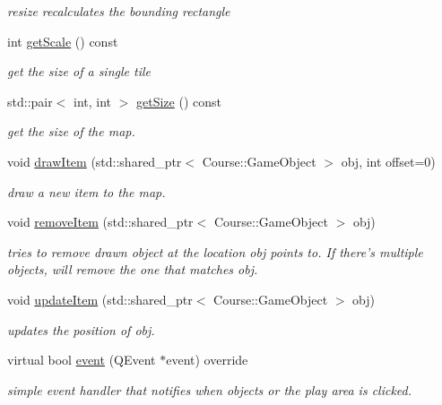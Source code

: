 \begin{DoxyCompactItemize}
\begin{DoxyCompactList}\small\item\em resize recalculates the bounding rectangle \end{DoxyCompactList}\item 
int \hyperlink{classGameScene_ab9902862cd5f550d9de3ff10cde80505}{get\-Scale} () const 
\begin{DoxyCompactList}\small\item\em get the size of a single tile \end{DoxyCompactList}\item 
std\-::pair$<$ int, int $>$ \hyperlink{classGameScene_a8c5c9cd5997ca6b17b2924f5cc09902c}{get\-Size} () const 
\begin{DoxyCompactList}\small\item\em get the size of the map. \end{DoxyCompactList}\item 
void \hyperlink{classGameScene_aaab2fceed119bca93ecf732e1f9aaa40}{draw\-Item} (std\-::shared\-\_\-ptr$<$ Course\-::\-Game\-Object $>$ obj, int offset=0)
\begin{DoxyCompactList}\small\item\em draw a new item to the map. \end{DoxyCompactList}\item 
void \hyperlink{classGameScene_a1cab3171dd8296baa28b091c5e8e22ab}{remove\-Item} (std\-::shared\-\_\-ptr$<$ Course\-::\-Game\-Object $>$ obj)
\begin{DoxyCompactList}\small\item\em tries to remove drawn object at the location obj points to. If there's multiple objects, will remove the one that matches obj. \end{DoxyCompactList}\item 
void \hyperlink{classGameScene_a8afcbd20cf3d7fa80dbf06883da17c2b}{update\-Item} (std\-::shared\-\_\-ptr$<$ Course\-::\-Game\-Object $>$ obj)
\begin{DoxyCompactList}\small\item\em updates the position of obj. \end{DoxyCompactList}\item 
virtual bool \hyperlink{classGameScene_a87d0fd08b1540319e8770e187379d4ba}{event} (Q\-Event $\ast$event) override
\begin{DoxyCompactList}\small\item\em simple event handler that notifies when objects or the play area is clicked. \end{DoxyCompactList}\end{DoxyCompactItemize}


